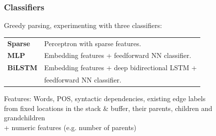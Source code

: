 \documentclass[t]{beamer}
\begin{document}
\begin{frame}
\frametitle{Classifiers}
Greedy parsing, experimenting with three classifiers:
\begin{flushleft}
	\begin{tabular}{ll}
	\textbf{Sparse} & Perceptron with sparse features. \\
	\textbf{MLP} & Embedding features + feedforward NN classifier. \\
	\textbf{BiLSTM} & Embedding features + deep bidirectional LSTM + \\
	  & feedforward NN classifier.
	\end{tabular}
	\vfill
	Features:
	Words, POS, syntactic dependencies, existing edge labels \\
	from fixed locations in the stack \& buffer, their parents, children and grandchildren \\
	+ numeric features (e.g. number of parents)
\end{flushleft}
\end{frame}
\end{document}
